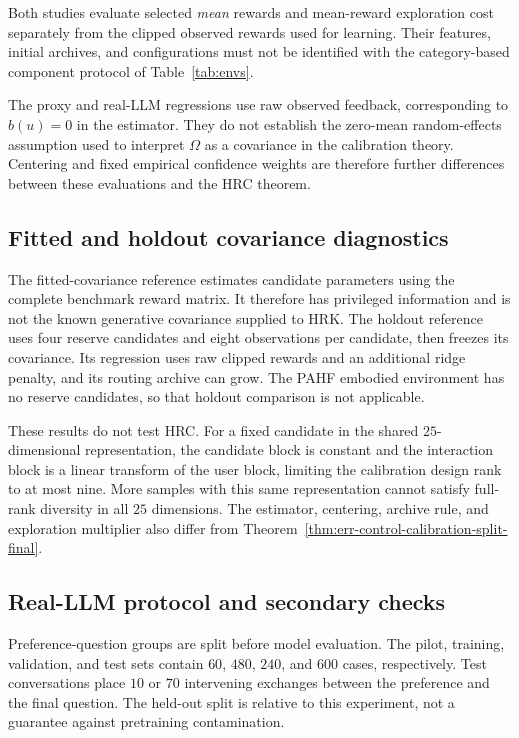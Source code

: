 \documentclass{article} %
\begin{document}
Both studies evaluate selected \emph{mean} rewards and mean-reward
exploration cost separately from the clipped observed rewards used for
learning. Their features, initial archives, and configurations must not be
identified with the category-based component protocol of
Table~\ref{tab:envs}.

The proxy and real-LLM regressions use raw observed feedback, corresponding
to $b(u)=0$ in the estimator. They do not establish the zero-mean
random-effects assumption used to interpret $\Omega$ as a covariance in the
calibration theory. Centering and fixed empirical confidence weights are
therefore further differences between these evaluations and the HRC theorem.

\subsection{Fitted and holdout covariance diagnostics}

The fitted-covariance reference estimates candidate parameters using the
complete benchmark reward matrix. It therefore has privileged information
and is not the known generative covariance supplied to HRK.
The holdout reference uses four reserve candidates and eight observations
per candidate, then freezes its covariance. Its regression uses raw clipped
rewards and an additional ridge penalty, and its routing archive can grow.
The PAHF embodied environment has no reserve candidates, so that holdout
comparison is not applicable.



These results do not test HRC. For a fixed candidate in the shared
$25$-dimensional representation, the candidate block is constant and the
interaction block is a linear transform of the user block, limiting the
calibration design rank to at most nine. More samples with this same
representation cannot satisfy full-rank diversity in all $25$ dimensions.
The estimator, centering, archive rule, and exploration multiplier also
differ from Theorem~\ref{thm:err-control-calibration-split-final}.

\subsection{Real-LLM protocol and secondary checks}

Preference-question groups are split before model evaluation.
The pilot, training, validation, and test sets contain $60$, $480$, $240$,
and $600$ cases, respectively. Test conversations place $10$ or $70$
intervening exchanges between the preference and the final question.
The held-out split is relative to this experiment, not a guarantee against
pretraining contamination.
\end{document}
